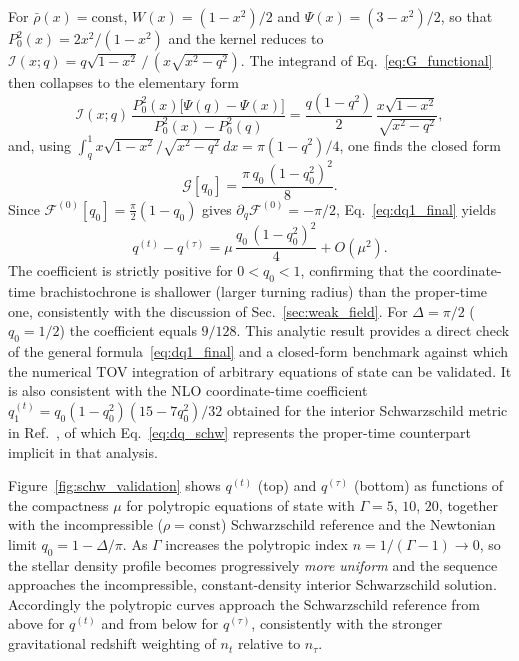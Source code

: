 \documentclass[
  aps,
  prd,
  twocolumn,
  nofootinbib,
  superscriptaddress,
  longbibliography
]{revtex4-2}
\begin{document}
For $\bar\rho(x)=\mathrm{const}$, $W(x)=(1-x^2)/2$ and
$\Psi(x)=(3-x^2)/2$, so that $P_0^2(x)=2x^2/(1-x^2)$ and the kernel
reduces to $\mathcal{I}(x;q)=q\sqrt{1-x^2}\,/\,(x\sqrt{x^2-q^2})$. The
integrand of Eq.~\eqref{eq:G_functional} then collapses to the
elementary form
\begin{equation}
\mathcal{I}(x;q)\,
\frac{P_0^2(x)\bigl[\Psi(q)-\Psi(x)\bigr]}{P_0^2(x)-P_0^2(q)}
=
\frac{q(1-q^2)}{2}\,
\frac{x\sqrt{1-x^2}}{\sqrt{x^2-q^2}},
\label{eq:integrand_schw}
\end{equation}
and, using $\int_{q}^{1}x\sqrt{1-x^2}/\sqrt{x^2-q^2}\,dx=
\pi(1-q^2)/4$, one finds the closed form
\begin{equation}
\mathcal{G}[q_0]=\frac{\pi\,q_0\,(1-q_0^2)^2}{8}.
\label{eq:G_schw}
\end{equation}
Since $\mathcal{F}^{(0)}[q_0]=\tfrac{\pi}{2}(1-q_0)$ gives
$\partial_q\mathcal{F}^{(0)}=-\pi/2$, Eq.~\eqref{eq:dq1_final} yields
\begin{equation}
q^{(t)}-q^{(\tau)}
=
\mu\,\frac{q_0\,(1-q_0^2)^2}{4}
+O(\mu^2).
\label{eq:dq_schw}
\end{equation}
The coefficient is strictly positive for $0<q_0<1$, confirming that the
coordinate-time brachistochrone is shallower (larger turning radius)
than the proper-time one, consistently with the discussion of
Sec.~\ref{sec:weak_field}. For $\Delta=\pi/2$ ($q_0=1/2$) the
coefficient equals $9/128$. This analytic result provides a direct
check of the general formula~\eqref{eq:dq1_final} and a closed-form
benchmark against which the numerical TOV integration of arbitrary
equations of state can be validated. It is also consistent with the
NLO coordinate-time coefficient
$q_1^{(t)}=q_0(1-q_0^2)(15-7q_0^2)/32$ obtained for the interior
Schwarzschild metric in Ref.~\cite{Rosignoli2026}, of which
Eq.~\eqref{eq:dq_schw} represents the proper-time counterpart implicit
in that analysis.

Figure~\ref{fig:schw_validation} shows $q^{(t)}$ (top) and $q^{(\tau)}$ (bottom) as functions of the compactness $\mu$ for polytropic equations of state with $\Gamma=5$, $10$, $20$, together with the incompressible ($\rho=\mathrm{const}$) Schwarzschild reference and the Newtonian limit $q_0=1-\Delta/\pi$.
As $\Gamma$ increases the polytropic index $n=1/(\Gamma-1)\to0$, so the stellar density profile becomes progressively \emph{more uniform} and the sequence approaches the incompressible, constant-density interior Schwarzschild solution. Accordingly the polytropic curves approach the Schwarzschild reference from above for $q^{(t)}$ and from below for $q^{(\tau)}$, consistently with the stronger gravitational redshift weighting of $n_t$ relative to $n_\tau$.
\end{document}
